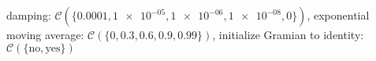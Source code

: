 damping: $\mathcal{C}(\{\num[scientific-notation=true]{0.0001},\num[scientific-notation=true]{1e-05},\num[scientific-notation=true]{1e-06},\num[scientific-notation=true]{1e-08},0\})$, exponential moving average: $\mathcal{C}(\{0,\num[scientific-notation=true]{0.3},\num[scientific-notation=true]{0.6},\num[scientific-notation=true]{0.9},\num[scientific-notation=true]{0.99}\})$, initialize Gramian to identity: $\mathcal{C}(\{\text{no},\text{yes}\})$
